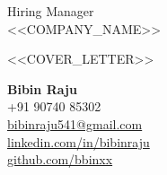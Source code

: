 \documentclass[11pt,a4paper]{letter}
\begin{document}
\begin{letter}{Hiring Manager\\
<<COMPANY_NAME>>}

<<COVER_LETTER>>

\vspace{0.5cm}

\textbf{Bibin Raju}\\
+91 90740 85302\\
\href{mailto:bibinraju541@gmail.com}{bibinraju541@gmail.com}\\
\href{https://linkedin.com/in/bibinraju}{linkedin.com/in/bibinraju}\\
\href{https://github.com/bbinxx}{github.com/bbinxx}

\end{letter}
\end{document}

